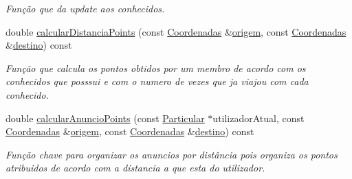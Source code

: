 \begin{DoxyCompactItemize}
\begin{DoxyCompactList}\small\item\em Função que da update aos conhecidos. \end{DoxyCompactList}\item 
double \hyperlink{class_anuncio_aa432828d0e8b6d84fc284d24fa920911}{calcular\+Distancia\+Points} (const \hyperlink{class_coordenadas}{Coordenadas} \&\hyperlink{class_anuncio_a9b3f8ac29ebf2a44e24ea2273064a7f5}{origem}, const \hyperlink{class_coordenadas}{Coordenadas} \&\hyperlink{class_anuncio_acdac86595f84cfb8a2bf54c414857168}{destino}) const 
\begin{DoxyCompactList}\small\item\em Função que calcula os pontos obtidos por um membro de acordo com os conhecidos que posssui e com o numero de vezes que ja viajou com cada conhecido. \end{DoxyCompactList}\item 
double \hyperlink{class_anuncio_adbede34af2bb9824ec0811d4a85cc035}{calcular\+Anuncio\+Points} (const \hyperlink{class_particular}{Particular} $\ast$utilizador\+Atual, const \hyperlink{class_coordenadas}{Coordenadas} \&\hyperlink{class_anuncio_a9b3f8ac29ebf2a44e24ea2273064a7f5}{origem}, const \hyperlink{class_coordenadas}{Coordenadas} \&\hyperlink{class_anuncio_acdac86595f84cfb8a2bf54c414857168}{destino}) const 
\begin{DoxyCompactList}\small\item\em Função chave para organizar os anuncios por distância pois organiza os pontos atribuidos de acordo com a distancia a que esta do utilizador. \end{DoxyCompactList}\end{DoxyCompactItemize}
